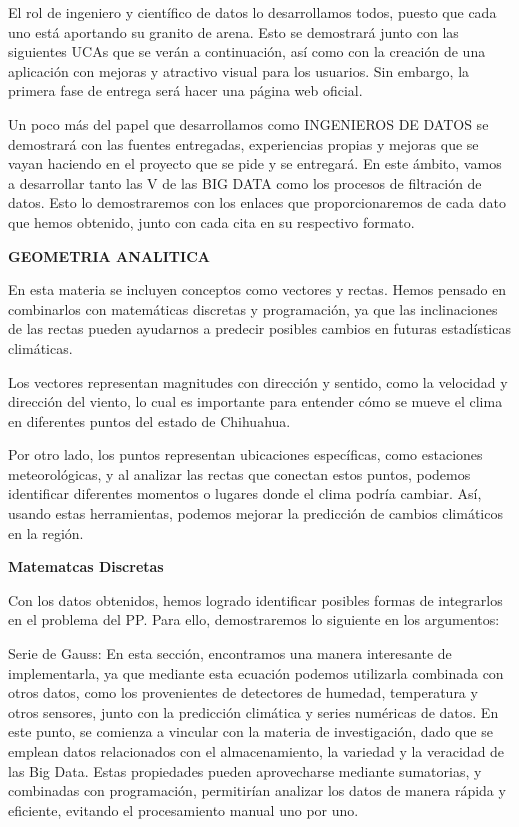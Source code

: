 \documentclass[12pt]{article}
\begin{document}
{{{{{	El rol de ingeniero y científico de datos lo desarrollamos todos, puesto que cada uno está aportando su granito de arena. Esto se demostrará junto con las siguientes UCAs que se verán a continuación, así como con la creación de una aplicación con mejoras y atractivo visual para los usuarios. Sin embargo, la primera fase de entrega será hacer una página web oficial.
	
	Un poco más del papel que desarrollamos como INGENIEROS DE DATOS se demostrará con las fuentes entregadas, experiencias propias y mejoras que se vayan haciendo en el proyecto que se pide y se entregará. En este ámbito, vamos a desarrollar tanto las V de las BIG DATA como los procesos de filtración de datos. Esto lo demostraremos con los enlaces que proporcionaremos de cada dato que hemos obtenido, junto con cada cita en su respectivo formato.
	
	\newpage
	\begin{center}
		{\huge \textbf{GEOMETRIA ANALITICA} }
	\end{center}
	\vspace{1cm} 
	{\large %
	En esta materia se incluyen conceptos como vectores y rectas. Hemos pensado en combinarlos con matemáticas discretas y programación, ya que las inclinaciones de las rectas pueden ayudarnos a predecir posibles cambios en futuras estadísticas climáticas.
	
	Los vectores representan magnitudes con dirección y sentido, como la velocidad y dirección del viento, lo cual es importante para entender cómo se mueve el clima en diferentes puntos del estado de Chihuahua.
	
	Por otro lado, los puntos representan ubicaciones específicas, como estaciones meteorológicas, y al analizar las rectas que conectan estos puntos, podemos identificar diferentes momentos o lugares donde el clima podría cambiar. Así, usando estas herramientas, podemos mejorar la predicción de cambios climáticos en la región.
			\newpage
		\begin{center}
			{\huge \textbf{Matematcas Discretas}}
		\end{center}
		\vspace{1cm} 
		{\large %
	Con los datos obtenidos, hemos logrado identificar posibles formas de integrarlos en el problema del PP. Para ello, demostraremos lo siguiente en los argumentos:
	
	Serie de Gauss:
	En esta sección, encontramos una manera interesante de implementarla, ya que mediante esta ecuación podemos utilizarla combinada con otros datos, como los provenientes de detectores de humedad, temperatura y otros sensores, junto con la predicción climática y series numéricas de datos. En este punto, se comienza a vincular con la materia de investigación, dado que se emplean datos relacionados con el almacenamiento, la variedad y la veracidad de las Big Data. Estas propiedades pueden aprovecharse mediante sumatorias, y combinadas con programación, permitirían analizar los datos de manera rápida y eficiente, evitando el procesamiento manual uno por uno.
	
}}}}}}}
\end{document}
